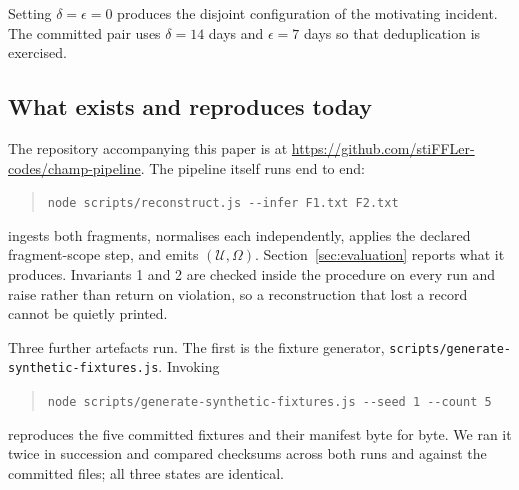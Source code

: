 Setting $\delta = \epsilon = 0$ produces the disjoint configuration of the
motivating incident. The committed pair uses $\delta = 14$ days and
$\epsilon = 7$ days so that deduplication is exercised.

\subsection{What exists and reproduces today}
\label{sec:implementation:reproduces}

The repository accompanying this paper is at
\url{https://github.com/stiFFLer-codes/champ-pipeline}.
The pipeline itself runs end to end:

\begin{quote}
\texttt{node scripts/reconstruct.js -{}-infer F1.txt F2.txt}
\end{quote}

ingests both fragments, normalises each independently, applies the declared
fragment-scope step, and emits $(\mathcal{U}, \Omega)$.
Section~\ref{sec:evaluation} reports what it produces. Invariants 1 and 2 are
checked inside the procedure on every run and raise rather than return on
violation, so a reconstruction that lost a record cannot be quietly printed.

Three further artefacts run. The first is the fixture generator,
\texttt{scripts/\allowbreak generate-\allowbreak synthetic-\allowbreak fixtures.js}.
Invoking

\begin{quote}
\texttt{node scripts/generate-synthetic-fixtures.js -{}-seed 1 -{}-count 5}
\end{quote}

reproduces the five committed fixtures and their manifest byte for byte. We ran it
twice in succession and compared checksums across both runs and against the
committed files; all three states are identical.

